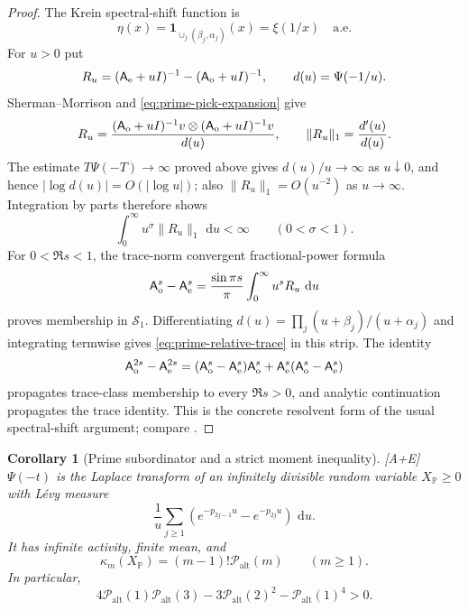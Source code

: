 \documentclass[11pt]{article}
\newtheorem{corollary}[theorem]{Corollary}
\theoremstyle{definition}
\theoremstyle{remark}
\newcommand{\PP}{\mathbb P}
\newcommand{\one}{\mathbf 1}
\newcommand{\Palt}{\mathcal P_{\mathrm{alt}}}
\newcommand{\status}[1]{\textnormal{\textcolor{accent}{\footnotesize[#1]}}}
\newcommand{\dd}{\,\mathrm d}
\begin{document}
\begin{proof}
The Krein spectral-shift function is
\[
 \eta(x)=\one_{\cup_j(\beta_j,\alpha_j)}(x)=\xi(1/x)\quad\text{a.e.}
\]
For $u>0$ put
\[
 R_u=(\mathsf A_{\rm e}+uI)^{-1}-(\mathsf A_{\rm o}+uI)^{-1},
 \qquad d(u)=\Psi(-1/u).
\]
Sherman--Morrison and \eqref{eq:prime-pick-expansion} give
\begin{equation}\label{eq:prime-resolvent-rank-one}
 R_u=\frac{(\mathsf A_{\rm o}+uI)^{-1}v\otimes
                 (\mathsf A_{\rm o}+uI)^{-1}v}{d(u)},
 \qquad
 \lVert R_u\rVert_1=\frac{d'(u)}{d(u)}.
\end{equation}
The estimate $T\Psi(-T)\to\infty$ proved above gives $d(u)/u\to\infty$ as
$u\downarrow0$, and hence $|\log d(u)|=O(|\log u|)$; also
$\lVert R_u\rVert_1=O(u^{-2})$ as $u\to\infty$.  Integration by parts therefore shows
\[
 \int_0^\infty u^\sigma\lVert R_u\rVert_1\,\dd u<\infty
 \qquad(0<\sigma<1).
\]
For $0<\Re s<1$, the trace-norm convergent fractional-power formula
\begin{equation}\label{eq:prime-fractional-resolvent}
 \mathsf A_{\rm o}^s-\mathsf A_{\rm e}^s
 =\frac{\sin\pi s}{\pi}\int_0^\infty u^sR_u\,\dd u
\end{equation}
proves membership in $\mathcal S_1$.  Differentiating
$d(u)=\prod_j(u+\beta_j)/(u+\alpha_j)$ and integrating termwise gives
\eqref{eq:prime-relative-trace} in this strip.  The identity
\[
 \mathsf A_{\rm o}^{2s}-\mathsf A_{\rm e}^{2s}
 =(\mathsf A_{\rm o}^s-\mathsf A_{\rm e}^s)\mathsf A_{\rm o}^s
 +\mathsf A_{\rm e}^s(\mathsf A_{\rm o}^s-\mathsf A_{\rm e}^s)
\]
propagates trace-class membership to every $\Re s>0$, and analytic continuation
propagates the trace identity.  This is the concrete resolvent form of the usual
spectral-shift argument; compare
\cite{BirmanYafaevSSF,IonascuRankOne,LiawRankOne}.
\end{proof}

\begin{corollary}[Prime subordinator and a strict moment inequality]
\label{cor:prime-subordinator}
\status{A+E}
$\Psi(-t)$ is the Laplace transform of an infinitely divisible random variable
$X_{\PP}\ge0$ with L\'evy measure
\begin{equation}\label{eq:prime-Levy-measure}
 \frac1u\sum_{j\ge1}
 (e^{-p_{2j-1}u}-e^{-p_{2j}u})\,\dd u.
\end{equation}
It has infinite activity, finite mean, and
\[
 \kappa_m(X_{\PP})=(m-1)!\Palt(m)\qquad(m\ge1).
\]
In particular,
\begin{equation}\label{eq:Palt-Hankel-inequality}
 4\Palt(1)\Palt(3)-3\Palt(2)^2-\Palt(1)^4>0.
\end{equation}
\end{corollary}
\end{document}
